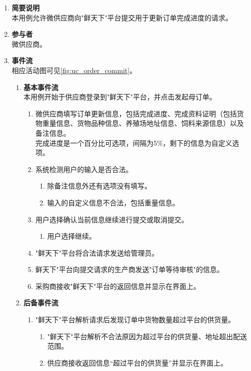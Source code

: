 \begin{enumerate}
    \item \textbf{简要说明}  \\ 本用例允许微供应商向"鲜天下"平台提交用于更新订单完成进度的请求。
    \item \textbf{参与者} \\ 微供应商。
    \item \textbf{事件流} \\ 相应活动图可见\autoref{fig:uc_order_commit}。
    \begin{enumerate} 
        \item \textbf{基本事件流} \\ 本用例开始于供应商登录到"鲜天下"平台，并点击发起母订单。
        \begin{enumerate}
            \item 微供应商填写订单更新信息，包括完成进度、完成资料证明（包括货物重量信息、货物品种信息、养殖场地址信息、饲料来源信息）以及备注信息。\\
            完成进度是一个百分比可选项，间隔为5\%，剩下的信息为自定义选项。


            \item 系统检测用户的输入是否合法。
            \begin{enumerate}
                \item 除备注信息外还有选项没有填写。
                \item 输入的自定义信息不合法，包括重量信息。
            \end{enumerate}

            \item 用户选择确认当前信息继续进行提交或取消提交。
            \begin{enumerate}
                \item 用户选择继续。
            \end{enumerate}

            \item "鲜天下"平台将合法请求发送给管理员。
            
            \item 鲜天下"平台向提交请求的生产商发送"订单等待审核"的信息。

            \item 采购商接收"鲜天下"平台的返回信息并显示在界面上。

        \end{enumerate}
        \item \textbf{后备事件流}
        \begin{enumerate}
            \item "鲜天下"平台解析请求后发现订单中货物数量超过平台的供货量。
            \begin{enumerate}
                \item "鲜天下"平台解析不合法原因为超过平台的供货量、地址超出配送范围。
                \item 供应商接收返回信息“超过平台的供货量”并显示在界面上。
            \end{enumerate}


\end{enumerate}
\end{enumerate}
\end{enumerate}

